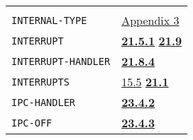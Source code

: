 \documentclass[a4paper]{scrbook}
\begin{document}
\begin{longtable}[]{@{}ll@{}}
\begin{minipage}[t]{0.70\columnwidth}
\end{minipage}\tabularnewline
\begin{minipage}[t]{0.24\columnwidth}\raggedright\strut
\texttt{INTERNAL-TYPE}\strut
\end{minipage} & \begin{minipage}[t]{0.70\columnwidth}\raggedright\strut
\href{appendix-3-predefined-types.md\#appendix-3-predefined-types}{Appendix 3}\strut
\end{minipage}\tabularnewline
\begin{minipage}[t]{0.24\columnwidth}\raggedright\strut
\texttt{INTERRUPT}\strut
\end{minipage} & \begin{minipage}[t]{0.70\columnwidth}\raggedright\strut
\textbf{\href{21-interrupts.md\#2151-iheader}{21.5.1}}
\textbf{\href{21-interrupts.md\#219-user-defined-interrupts}{21.9}}\strut
\end{minipage}\tabularnewline
\begin{minipage}[t]{0.24\columnwidth}\raggedright\strut
\texttt{INTERRUPT-HANDLER}\strut
\end{minipage} & \begin{minipage}[t]{0.70\columnwidth}\raggedright\strut
\textbf{\href{21-interrupts.md\#2184-gc}{21.8.4}}\strut
\end{minipage}\tabularnewline
\begin{minipage}[t]{0.24\columnwidth}\raggedright\strut
\texttt{INTERRUPTS}\strut
\end{minipage} & \begin{minipage}[t]{0.70\columnwidth}\raggedright\strut
\href{15-lexical-blocking.md\#155-initial-state}{15.5}
\textbf{\href{21-interrupts.md\#211-definitions-of-terms}{21.1}}\strut
\end{minipage}\tabularnewline
\begin{minipage}[t]{0.24\columnwidth}\raggedright\strut
\texttt{IPC-HANDLER}\strut
\end{minipage} & \begin{minipage}[t]{0.70\columnwidth}\raggedright\strut
\textbf{\href{23-mdl-as-a-system-process.md\#2342-the-ipc-interrupt}{23.4.2}}\strut
\end{minipage}\tabularnewline
\begin{minipage}[t]{0.24\columnwidth}\raggedright\strut
\texttt{IPC-OFF}\strut
\end{minipage} & \begin{minipage}[t]{0.70\columnwidth}\raggedright\strut
\textbf{\href{23-mdl-as-a-system-process.md\#2343-ipc-off}{23.4.3}}\strut

\end{minipage}
\end{longtable}
\end{document}
